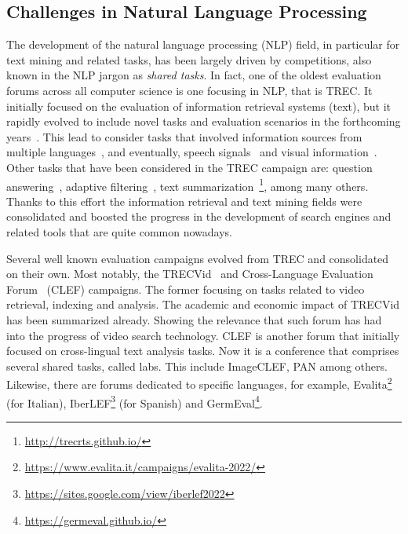 \documentclass[twoside,11pt]{article}
\begin{document}
\subsection{Challenges in Natural Language Processing}
The development of the natural language processing (NLP) field, in particular for text mining and related tasks, has been largely driven by competitions, also known in the NLP jargon as \emph{shared tasks}. In fact, one of the oldest evaluation forums across all computer science is one focusing in NLP, that is TREC.  %
It initially focused on the evaluation of information retrieval systems (text), but it rapidly evolved to include novel tasks and evaluation scenarios in the forthcoming years~\citep{DBLP:conf/tipster/VoorheesH98,DBLP:journals/ipm/Muresan07,OVER2001369}. This lead to consider tasks that involved information sources from multiple languages~\citep{harman:trec}, and eventually, speech signals~\citep{10.5555/2835865.2835867}  and visual information~\citep{DBLP:journals/corr/abs-2104-13473}. Other tasks that have been  considered in the TREC campaign are: question answering~\citep{DBLP:journals/nle/Voorhees01}, adaptive filtering~\citep{DBLP:conf/trec/Harman95}, text summarization~\footnote{\url{http://trecrts.github.io/}}, among many others. Thanks to this effort the information retrieval and text mining fields were consolidated and boosted the progress in the development of search engines and related tools that are quite common nowadays. 

Several well known evaluation campaigns evolved from TREC and consolidated on their own. Most notably, the TRECVid~\citep{DBLP:journals/corr/abs-2104-13473} and Cross-Language Evaluation Forum~\citep{10.1007/3-540-44645-1_9} (CLEF) campaigns. The former focusing on tasks related to video retrieval, indexing and analysis. The academic and economic impact of TRECVid has been summarized already. Showing the relevance that such forum has had into the progress of video search technology. CLEF is another forum that initially focused on cross-lingual text analysis tasks. Now it is a conference that comprises several shared tasks, called labs. This include ImageCLEF, PAN among others. 
Likewise, there are forums dedicated to specific languages, for example, Evalita\footnote{\url{https://www.evalita.it/campaigns/evalita-2022/}} (for Italian), IberLEF\footnote{\url{https://sites.google.com/view/iberlef2022}} (for Spanish) and GermEval\footnote{\url{https://germeval.github.io/}}. 
\end{document}
